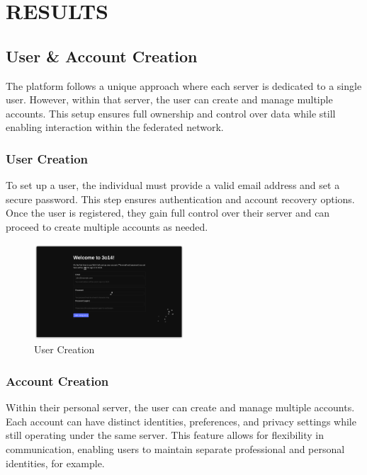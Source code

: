 \chapter{RESULTS}

\section{User \& Account Creation}

The platform follows a unique approach where each server is dedicated to a single user. However, within that server, the user can create and manage multiple accounts. This setup ensures full ownership and control over data while still enabling interaction within the federated network.

\subsection{User Creation}
To set up a user, the individual must provide a valid email address and set a secure password. This step ensures authentication and account recovery options. Once the user is registered, they gain full control over their server and can proceed to create multiple accounts as needed.

\begin{figure}[h!]
    \centering
    \includegraphics[width=0.5\textwidth]{Graphics/usercreation.png}
    \caption{User Creation}
    \label{fig:user_creation}
\end{figure}

\subsection{Account Creation}
Within their personal server, the user can create and manage multiple accounts. Each account can have distinct identities, preferences, and privacy settings while still operating under the same server. This feature allows for flexibility in communication, enabling users to maintain separate professional and personal identities, for example.

